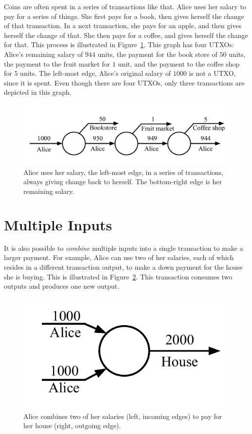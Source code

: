 Coins are often spent in a series of transactions like that. Alice uses her salary
to pay for a series of things. She first pays for a book, then gives herself the change
of that transaction. In a next transaction, she pays for an apple, and then gives herself
the change of that. She then pays for a coffee, and gives herself the change for that.
This process is illustrated in Figure~\ref{fig.utxo-change-chain}. This graph has four
UTXOs: Alice's remaining salary of $944$ units, the payment for the book store of $50$
units, the payment to the fruit market for $1$ unit, and the payment to the coffee shop
for $5$ units. The left-most edge, Alice's original salary of $1000$ is not a UTXO, since
it is spent. Even though there are four UTXOs, only three transactions are depicted in this
graph.

\begin{figure}[h]
    \centering
    \includegraphics[width=0.75 \columnwidth,keepaspectratio]{figures/utxo-change-chain.pdf}
    \caption{Alice uses her salary, the left-most edge, in a series of transactions,
             always giving change back to herself. The bottom-right edge is her remaining salary.}
    \label{fig.utxo-change-chain}
\end{figure}

\section{Multiple Inputs}

It is also possible to \emph{combine} multiple inputs into a single transaction to make
a larger payment. For example, Alice can use two of her salaries, each of which resides
in a different transaction output, to make a down payment for the house she is buying.
This is illustrated in Figure~\ref{fig.utxo-multiple-inputs}. This transaction consumes
two outputs and produces one new output.

\begin{figure}[h]
    \centering
    \includegraphics[width=0.35 \columnwidth,keepaspectratio]{figures/utxo-multiple-inputs.pdf}
    \caption{Alice combines two of her salaries (left, incoming edges) to pay for her
             house (right, outgoing edge).}
    \label{fig.utxo-multiple-inputs}
\end{figure}

